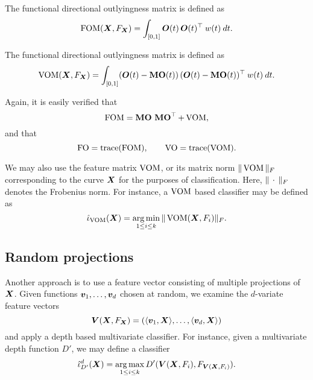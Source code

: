 \begin{definition}
    The functional directional outlyingness matrix is defined as
    \begin{equation}
        \operatorname{FOM}(\bm{X}, F_{\bm{X}}) = \int_{[0, 1]} \bm{O}(t)\,\bm{O}(t)^\top \:w(t)\:dt.
    \end{equation}
\end{definition}

\begin{definition}
    The functional directional outlyingness matrix is defined as
    \begin{equation}
        \operatorname{VOM}(\bm{X}, F_{\bm{X}}) = \int_{[0, 1]} (\bm{O}(t) - \operatorname{\textbf{MO}}(t))\,(\bm{O}(t) - \operatorname{\textbf{MO}}(t))^\top \:w(t)\:dt.
    \end{equation}
\end{definition}

Again, it is easily verified that
\begin{equation}
    \operatorname{FOM} = \operatorname{\textbf{MO}}\,\operatorname{\textbf{MO}}^\top + \operatorname{VOM},
\end{equation}
and that
\begin{equation}
    \operatorname{FO} = \operatorname{trace}(\operatorname{FOM}), \qquad
    \operatorname{VO} = \operatorname{trace}(\operatorname{VOM}).
\end{equation}

We may also use the feature matrix $\operatorname{VOM}$, or its matrix norm $\Vert \operatorname{VOM} \Vert_F$
corresponding to the curve $\bm{X}$ for the purposes of classification.
Here, $\Vert \,\cdot\, \Vert_F$ denotes the Frobenius norm.
For instance, a $\operatorname{VOM}$ based classifier may be defined as
\begin{equation}
    \hat{\iota}_{\operatorname{VOM}}(\bm{X}) = \operatorname*{arg\,min}_{1 \leq i \leq k} \Vert \operatorname{VOM}(\bm{X}, F_i) \Vert_F.
\end{equation}



\subsection{Random projections}

Another approach is to use a feature vector consisting of multiple projections
of $\bm{X}$.
Given functions $\bm{v}_1, \dots, \bm{v}_d$ chosen at random, we examine the
$d$-variate feature vectors
\begin{equation}
    \bm{V}(\bm{X}, F_{\bm{X}}) = \left(\langle \bm{v}_1, \bm{X} \rangle, \dots, \langle \bm{v}_d, \bm{X} \rangle\right)
\end{equation}
and apply a depth based multivariate classifier.
For instance, given a multivariate depth function $D'$, we may define a
classifier
\begin{equation}
    \hat{\iota}^d_{D'}(\bm{X}) = \operatorname*{arg\,max}_{1 \leq i \leq k} D'(\bm{V}(\bm{X}, F_i), F_{\bm{V}(\bm{X}, F_i)}).
\end{equation}
